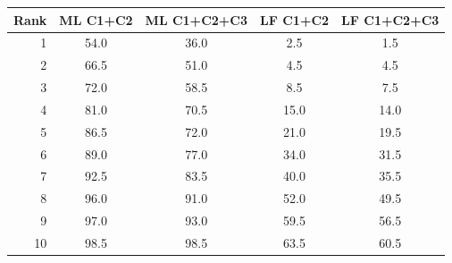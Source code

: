 \begin{tabular}{rcccc}
\toprule
Rank & ML C1+C2 & ML C1+C2+C3 & LF C1+C2 & LF C1+C2+C3 \\
\midrule
1 & 54.0 & 36.0 & 2.5 & 1.5 \\
2 & 66.5 & 51.0 & 4.5 & 4.5 \\
3 & 72.0 & 58.5 & 8.5 & 7.5 \\
4 & 81.0 & 70.5 & 15.0 & 14.0 \\
5 & 86.5 & 72.0 & 21.0 & 19.5 \\
6 & 89.0 & 77.0 & 34.0 & 31.5 \\
7 & 92.5 & 83.5 & 40.0 & 35.5 \\
8 & 96.0 & 91.0 & 52.0 & 49.5 \\
9 & 97.0 & 93.0 & 59.5 & 56.5 \\
10 & 98.5 & 98.5 & 63.5 & 60.5 \\
\bottomrule
\end{tabular}
